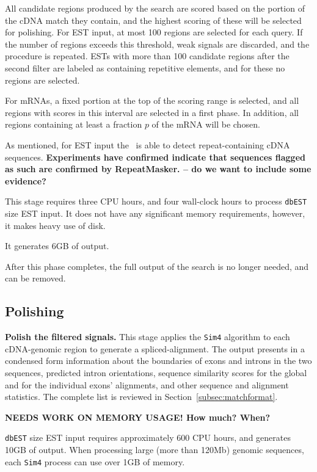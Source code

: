 \documentclass[twoside,11pt]{book}
\begin{document}
All candidate regions produced by the search are scored based on the
portion of the cDNA match they contain, and the highest scoring of
these will be selected for polishing. For EST input, at most 100
regions are selected for each query. If the number of regions exceeds
this threshold, weak signals are discarded, and the procedure is
repeated. ESTs with more than 100 candidate regions after the second
filter are labeled as containing repetitive elements, and for these no
regions are selected.

For mRNAs, a fixed portion at the top of the scoring range is selected,
and all regions with scores in this interval are selected in a first phase.
In addition, all regions containing at least a fraction $p$ of the mRNA
will be chosen.

As mentioned, for EST input the \ESTmapper\ is able to detect
repeat-containing cDNA sequences.  {\bf Experiments have confirmed
indicate that sequences flagged as such are confirmed by RepeatMasker.
-- do we want to include some evidence?}

This stage requires three CPU hours, and four wall-clock hours to
process {\tt dbEST} size EST input.  It does not have any significant
memory requirements, however, it makes heavy use of disk.

It generates 6GB of output.

After this phase completes, the full output of the search is no longer
needed, and can be removed.

\subsection*{Polishing}

{\bf Polish the filtered signals.}  This stage applies the {\tt Sim4}
algorithm to each cDNA-genomic region to generate a spliced-alignment.
The output presents in a condensed form information about the
boundaries of exons and introns in the two sequences, predicted intron
orientations, sequence similarity scores for the global and for the
individual exons' alignments, and other sequence and alignment
statistics. The complete list is reviewed in
Section~\ref{subsec:matchformat}.

{\bf NEEDS WORK ON MEMORY USAGE!  How much?  When?}

{\tt dbEST} size EST input requires approximately 600 CPU hours, and
generates 10GB of output.  When processing large (more than 120Mb) genomic
sequences, each {\tt Sim4} process can use over 1GB of memory.
\end{document}
